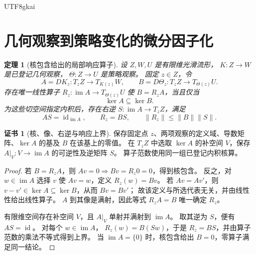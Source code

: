 \documentclass[12pt,a4paper,openany,notitlepage]{report}
\theoremstyle{plain}
\newtheorem{theorem}{定理}[chapter]
\theoremstyle{definition}
\newtheorem*{certificate}{证书}
\theoremstyle{remark}
\def\mathcal#1{#1}\def\mathsf#1{#1}\def\mathbb#1{#1}%
\begin{document}
\begin{CJK*}{UTF8}{gkai}
\section{几何观察到策略变化的微分因子化}
\label{hgov:geo:response}

\begin{theorem}[核包含给出的局部响应算子]
\label{hgov:geo:thm:factor}
设 $\mathcal Z,\mathcal W,\mathcal U$ 是有限维光滑流形，
$\mathcal K:\mathcal Z\to\mathcal W$ 是已登记几何观察，
$\Theta:\mathcal Z\to\mathcal U$ 是策略观察。
固定 $z\in\mathcal Z$，令
\[
A=D\mathcal K_z:T_z\mathcal Z\to T_{\mathcal K(z)}\mathcal W,
\qquad
B=D\Theta_z:T_z\mathcal Z\to T_{\Theta(z)}\mathcal U.
\]
存在唯一线性算子
$\mathcal R_z:\operatorname{im}A\to T_{\Theta(z)}\mathcal U$
使 $B=\mathcal R_zA$，当且仅当
\begin{equation}
\label{hgov:geo:eq:kernel}
\ker A\subseteq\ker B.
\end{equation}
为这些切空间指定内积后，存在右逆
$S:\operatorname{im}A\to T_z\mathcal Z$，满足
\[
AS=\operatorname{id}_{\operatorname{im}A},\qquad
\mathcal R_z=BS,\qquad
\lVert\mathcal R_z\rVert\le\lVert B\rVert\lVert S\rVert.
\]
\end{theorem}

\begin{certificate}[核、像、右逆与响应上界]
保存固定点 $z$、两项观察的定义域、导数矩阵、$\ker A$ 的基及 $B$ 在该基上的零值。
在 $T_z\mathcal Z$ 中选取 $\ker A$ 的补空间 $V$，保存
$A|_V:V\to\operatorname{im}A$ 的可逆性及逆矩阵 $S$。
算子范数使用同一组已登记内积核算。
\end{certificate}

\begin{proof}
若 $B=\mathcal R_zA$，则
$Av=0\Rightarrow Bv=\mathcal R_z0=0$，得到核包含。
反之，对 $w\in\operatorname{im}A$ 选择 $v$ 使 $Av=w$，定义
$\mathcal R_z(w)=Bv$。
若 $Av=Av'$，则 $v-v'\in\ker A\subseteq\ker B$，从而 $Bv=Bv'$；
故该定义与所选代表无关，并由线性性给出线性算子。
$A$ 到其像是满射，因此等式 $\mathcal R_zA=B$ 唯一确定 $\mathcal R_z$。

有限维空间存在补空间 $V$，且 $A|_V$ 单射并满射到 $\operatorname{im}A$。
取其逆为 $S$，便有 $AS=\operatorname{id}$。
对每个 $w\in\operatorname{im}A$，
$\mathcal R_z(w)=B(Sw)$，于是 $\mathcal R_z=BS$，并由算子范数的乘法不等式得到上界。
当 $\operatorname{im}A=\{0\}$ 时，核包含给出 $B=0$，零算子满足同一结论。
\end{proof}


\end{CJK*}
\end{document}
